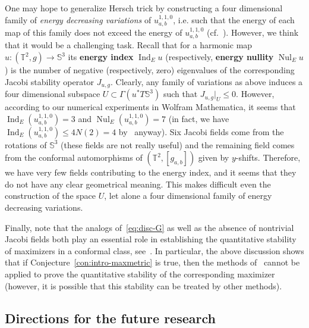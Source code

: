 \documentclass{amsart}
\let\le\leqslant
\DeclareMathOperator{\Ind}{Ind}
\DeclareMathOperator{\Nul}{Nul}
\theoremstyle{plain}
\theoremstyle{definition}
\theoremstyle{remark}
\begin{document}
One may hope to generalize Hersch trick by constructing a four dimensional
family of \emph{energy decreasing variations} of \(u_{a,b}^{1,1,0}\), i.e. such
that the energy of each map of this family does not exceed the energy of
\(u_{a,b}^{1,1,0}\) (cf.~\cite{Kar2024}). However, we think that it would be a
challenging task. Recall that for a harmonic map \(u\colon (\mathbb
T^2,g)\to\mathbb S^3\) its \textbf{energy index} \(\Ind_E u\) (respectively,
\textbf{energy nullity} \(\Nul_E u\)) is the number of negative (respectively,
zero) eigenvalues of the corresponding Jacobi stability operator \(J_{u,g}\).
Clearly, any family of variations as above induces a four dimensional subspace
\(U\subset\Gamma(u^*T\mathbb S^3)\) such that \(J_{u,g}|_U\le 0\). However,
according to our numerical experiments in Wolfram Mathematica, it seems that
\(\Ind_E(u_{a,b}^{1,1,0})=3\) and \(\Nul_E(u_{a,b}^{1,1,0})=7\) (in fact, we
have \(\Ind_E(u_{a,b}^{1,1,0})\le 4N(2)=4\) by~\cite[Proposition~1.6]{Kar2021}
anyway). Six Jacobi fields come from the rotations of \(\mathbb S^3\) (these
fields are not really useful) and the remaining field comes from the conformal
automorphisms of \((\mathbb T^2,[g_{a,b}])\) given by \(y\)-shifts. Therefore,
we have very few fields contributing to the energy index, and it seems that they
do not have any clear geometrical meaning. This makes difficult even the
construction of the space \(U\), let alone a four dimensional family of energy
decreasing variations.

Finally, note that the analogs of~\eqref{eq:disc-G} as well as the absence of
nontrivial Jacobi fields both play an essential role in establishing the
quantitative stability of maximizers in a conformal class, see~\cite{KNPS2025}.
In particular, the above discussion shows that if
Conjecture~\ref{con:intro-maxmetric} is true, then the methods
of~\cite{KNPS2025} cannot be applied to prove the quantitative stability of the
corresponding maximizer (however, it is possible that this stability can be
treated by other methods).

\subsection{Directions for the future research}
\end{document}

